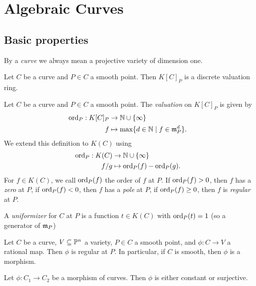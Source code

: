 \section{Algebraic Curves}

\subsection{Basic properties}

By a \emph{curve} we always mean a projective variety of dimension one.

\begin{proposition}
	Let $C$ be a curve and $P \in C$ a smooth point.
	Then $K[C]_P$ is a discrete valuation ring.
\end{proposition}

\begin{definition}
	Let $C$ be a curve and $P \in C$ a smooth point. The \emph{valuation}
	on $K[C]_P$ is given by
	\begin{align*}
		\operatorname{ord}_P: K[C]_P &\to \mathbb{N}\cup\{\infty\}\\
		f &\mapsto \max\{d \in \mathbb{N} \mid f \in \mathfrak{m}_P^d\}.
	\end{align*}
	We extend this definition to $K(C)$ using
	\begin{align*}
		\operatorname{ord}_P: K(C) &\to \mathbb{N}\cup\{\infty\}\\
		f/g &\mapsto \operatorname{ord}_P(f) - \operatorname{ord}_P(g).
	\end{align*}
	For $f \in K(C)$, we call $\operatorname{ord}_P(f)$ the order of $f$ at $P$.
	If $\operatorname{ord}_P(f) > 0$, then $f$ has a \emph{zero} at $P$,
	if $\operatorname{ord}_P(f) < 0$, then $f$ has a \emph{pole} at $P$,
	if $\operatorname{ord}_P(f) \geq 0$, then $f$ is \emph{regular} at $P$.
	
	A \emph{uniformizer} for $C$ at $P$ is a function $t \in K(C)$ with
	$\operatorname{ord}_P(t) = 1$ (so a generator of $\mathfrak{m}_P$)
\end{definition}

\begin{proposition}
	Let $C$ be a curve, $V \subseteq \mathbb{P}^n$ a variety,
	$P \in C$ a smooth point, and $\phi: C \to V$ a rational map.
	Then $\phi$ is regular at $P$. In particular, if $C$ is smooth, 
	then $\phi$ is a morphism.
\end{proposition}

\begin{theorem}
	Let $\phi: C_1 \to C_2$ be a morphism of curves. Then $\phi$ is either
	constant or surjective.
\end{theorem}

